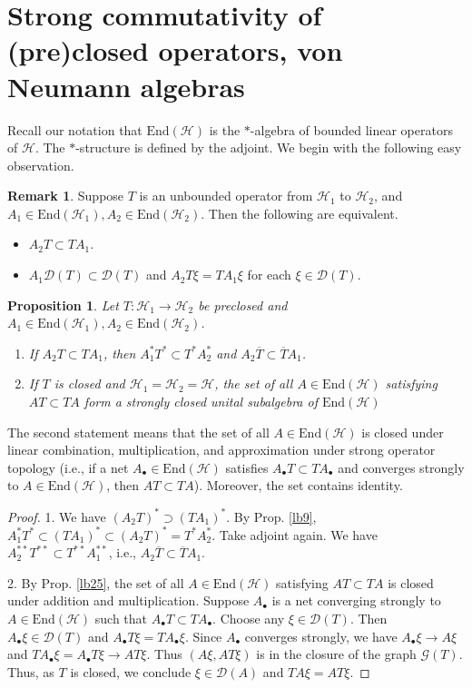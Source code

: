 \documentclass[12pt,a4paper,notitlepage]{article}
\theoremstyle{definition}
\newtheorem{rem}[df]{Remark}
\theoremstyle{plain}
\newtheorem{pp}[df]{Proposition}
\newcommand{\mc}{\mathcal}
\newcommand{\ovl}{\overline}
\newcommand{\End}{\mathrm{End}} %
\newcommand{\Dom}{\scr D}
\newcommand{\scr}{\mathscr}
\newcommand{\blt}{\bullet}
\numberwithin{equation}{section}
\begin{document}
\section{Strong commutativity of (pre)closed operators, von Neumann algebras}\label{lb67}



Recall our notation that $\End(\mc H)$ is the $*$-algebra of bounded linear operators of $\mc H$. The $*$-structure is defined by the adjoint. We begin with the following easy observation.

\begin{rem}
Suppose $T$ is an unbounded operator from $\mc H_1$ to $\mc H_2$, and $A_1\in\End(\mc H_1),A_2\in\End(\mc H_2)$. Then the following are equivalent.
\begin{itemize}
\item $A_2T\subset TA_1$.
\item $A_1\Dom(T)\subset \Dom(T)$ and $A_2T\xi=TA_1\xi$ for each $\xi\in\Dom(T)$. 
\end{itemize}
\end{rem}

\begin{pp}\label{lb26}
Let $T:\mc H_1\rightarrow\mc H_2$ be preclosed and $A_1\in\End(\mc H_1),A_2\in\End(\mc H_2)$.
\begin{enumerate}
\item If $A_2T\subset TA_1$, then $A_1^*T^*\subset T^*A_2^*$ and $A_2\ovl T\subset \ovl T A_1$.
\item If $T$ is closed and $\mc H_1=\mc H_2=\mc H$, the set of all $A\in\End(\mc H)$ satisfying $AT\subset TA$ form a strongly closed unital subalgebra of $\End(\mc H)$
\end{enumerate}
\end{pp}



The second statement means that the set of all $A\in\End(\mc H)$ is closed under linear combination, multiplication, and approximation under strong operator topology (i.e., if a net $A_\blt\in \End(\mc H)$ satisfies $A_\blt T\subset TA_\blt$ and converges strongly to $A\in\End(\mc H)$, then $AT\subset TA$). Moreover, the set contains identity.

\begin{proof}
1. We have $(A_2T)^*\supset (TA_1)^*$. By Prop. \ref{lb9}, $A_1^*T^*\subset (TA_1)^*\subset (A_2T)^*=T^*A_2^*$. Take adjoint again. We have $A_2^{**}T^{**}\subset T^{**}A_1^{**}$, i.e., $A_2\ovl{T}\subset\ovl{T}A_1$.

2. By Prop. \ref{lb25}, the set of all $A\in\End(\mc H)$ satisfying $AT\subset TA$ is closed under addition and multiplication. Suppose $A_\blt$ is a net converging strongly to $A\in\End(\mc H)$ such that $A_\blt T\subset TA_\blt$. Choose any $\xi\in\Dom(T)$. Then $A_\blt\xi\in\Dom(T)$ and $A_\blt T\xi=TA_\blt\xi$. Since $A_\blt$ converges strongly, we have $A_\blt\xi\rightarrow A\xi$  and $TA_\blt\xi=A_\blt T\xi\rightarrow AT\xi$. Thus $(A\xi,AT\xi)$ is in the closure of the graph $\scr G(T)$. Thus, as $T$ is closed, we conclude $\xi\in\Dom(A)$ and $TA\xi=AT\xi$.
\end{proof}
\end{document}
